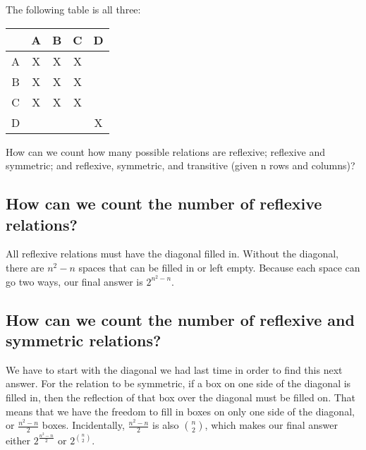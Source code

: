 \documentclass[11pt,twosided]{article}
\begin{document}
The following table is all three:
\begin{center}
\begin{tabular} {c|c c c c}
& A & B & C & D \\
\hline
A & X & X & X &  \\
B & X & X & X &  \\
C & X & X & X &  \\
D &  &  &  & X \\
\end{tabular}
\end{center}
How can we count how many possible relations are reflexive; reflexive and symmetric; and reflexive, symmetric, and transitive (given n rows and columns)?
\subsection{How can we count the number of reflexive relations?}
All reflexive relations must have the diagonal filled in. Without the diagonal, there are \(n^{2} - n\) spaces that can be filled in or left empty. Because each space can go two ways, our final answer is \(2^{n^{2}-n}\).
\subsection{How can we count the number of reflexive and symmetric relations?}
We have to start with the diagonal we had last time in order to find this next answer. For the relation to be symmetric, if a box on one side of the diagonal is filled in, then the reflection of that box over the diagonal must be filled on. That means that we have the freedom to fill in boxes on only one side of the diagonal, or \(\frac{n^{2}-n}{2}\) boxes. Incidentally, \(\frac{n^{2}-n}{2}\) is also \(\binom{n}{2}\), which makes our final answer either \(2^{\frac{n^{2}-n}{2}}\) or \(2^{\binom{n}{2}}\).
\end{document}
